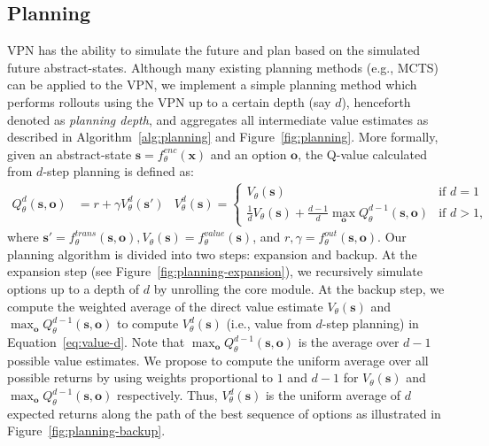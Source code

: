 \documentclass{article}
\newcommand{\option}{o}
\newcommand{\cutsubsectionup}{\vspace*{-0.04in}}
\newcommand{\cutsubsectiondown}{\vspace*{-0.03in}}
\begin{document}
\cutsubsectionup
\subsection{Planning} \label{sec:planning}
\cutsubsectiondown
VPN has the ability to simulate the future and plan based on the simulated future abstract-states. Although many existing planning methods (e.g., MCTS) can be applied to the VPN, we implement a simple planning method which performs rollouts using the VPN up to a certain depth (say $d$), henceforth denoted as \textit{planning depth}, and aggregates all intermediate value estimates as described in Algorithm~\ref{alg:planning} and Figure~\ref{fig:planning}. 
More formally, given an abstract-state $\textbf{s}=f^{enc}_{\theta}(\textbf{x})$ and an option $\textbf{\option{}}$, the Q-value calculated from $d$-step planning is defined as:
\begin{align}
Q^d_{\theta}(\textbf{s},\textbf{\option{}}) & = r+\gamma V^d_\theta(\textbf{s}')
&
V^d_{\theta}(\textbf{s})=\begin{cases}
V_{\theta}(\textbf{s}) & \mbox{if } d=1 \\
\frac{1}{d}V_{\theta}(\textbf{s})+\frac{d-1}{d}\max_{\textbf{\option{}}}Q^{d-1}_{\theta}(\textbf{s},\textbf{\option{}}) & \mbox{if } d>1 ,
\end{cases}
\label{eq:value-d}
\end{align}
where $\textbf{s}' = f^{trans}_{\theta}(\textbf{s},\textbf{\option{}}),V_{\theta}(\textbf{s})=f^{value}_{\theta}(\textbf{s})$, and $r,\gamma = f^{out}_\theta(\textbf{s}, \textbf{\option{}})$. Our planning algorithm is divided into two steps: expansion and backup. At the expansion step (see Figure~\ref{fig:planning-expansion}), we recursively simulate options up to a depth of $d$ by unrolling the core module.
At the backup step, we compute the weighted average of the direct value estimate $V_\theta(\textbf{s})$ and $\max_{\textbf{\option{}}}Q^{d-1}_{\theta}(\textbf{s},\textbf{\option{}})$ to compute $V^{d}_{\theta}(\textbf{s})$ (i.e., value from $d$-step planning) in Equation~\ref{eq:value-d}. Note that $\max_{\textbf{\option{}}}Q^{d-1}_{\theta}(\textbf{s},\textbf{\option{}})$ is the average over $d-1$ possible value estimates. We propose to compute the uniform average over all possible returns by using weights proportional to $1$ and $d-1$ for $V_\theta(\textbf{s})$ and $\max_{\textbf{\option{}}}Q^{d-1}_{\theta}(\textbf{s},\textbf{\option{}})$ respectively. Thus, $V^{d}_{\theta}(\textbf{s})$ is the uniform average of $d$ expected returns along the path of the best sequence of options as illustrated in Figure~\ref{fig:planning-backup}.
\end{document}

